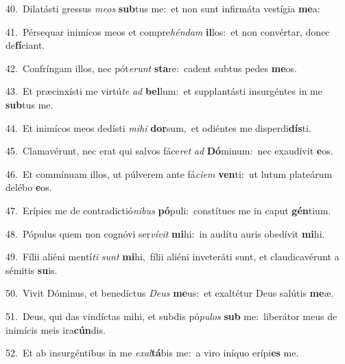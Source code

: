 {\numbfont\textcolor{\numbcolor}{40.}}~Dilatásti gressus \textit{me}\-\textit{os} \textbf{sub}\-tus me:~\star et non sunt infirmáta vestígia \textbf{me}\-a:\par
{\numbfont\textcolor{\numbcolor}{41.}}~Pérsequar inimícos meos et compre\-\textit{hén}\-\textit{dam} \textbf{il}\-los:~\star et non convértar, donec de\-\textbf{fí}\-ciant.\par
{\numbfont\textcolor{\numbcolor}{42.}}~Confríngam illos, nec pót\-\textit{e}\-\textit{runt} \textbf{sta}\-re:~\star cadent subtus pedes \textbf{me}\-os.\par
{\numbfont\textcolor{\numbcolor}{43.}}~Et præcinxísti me virtú\textit{te} \textit{ad} \textbf{bel}\-lum:~\star et supplantásti insurgéntes in me \textbf{sub}\-tus me.\par
{\numbfont\textcolor{\numbcolor}{44.}}~Et inimícos meos dedísti \textit{mi}\-\textit{hi} \textbf{dor}\-sum,~\star et odiéntes me disperdi\-\textbf{dís}\-ti.\par
{\numbfont\textcolor{\numbcolor}{45.}}~Clamavérunt, nec erat qui salvos fáce\textit{ret} \textit{ad} \textbf{Dó}\-minum:~\star nec exaudívit \textbf{e}\-os.\par
{\numbfont\textcolor{\numbcolor}{46.}}~Et commínuam illos, ut púlverem ante fá\-\textit{ci}\-\textit{em} \textbf{ven}\-ti:~\star ut lutum plateárum delébo \textbf{e}\-os.\par
{\numbfont\textcolor{\numbcolor}{47.}}~Erípies me de contradictió\-\textit{ni}\-\textit{bus} \textbf{pó}\-puli:~\star constítues me in caput \textbf{gén}\-tium.\par
{\numbfont\textcolor{\numbcolor}{48.}}~Pópulus quem non cognóvi ser\-\textit{ví}\-\textit{vit} \textbf{mi}\-hi:~\star in audítu auris obedívit \textbf{mi}\-hi.\par
{\numbfont\textcolor{\numbcolor}{49.}}~Fílii aliéni mentí\textit{ti} \textit{sunt} \textbf{mi}\-hi,~\star fílii aliéni inveteráti sunt, et claudicavérunt a sémitis \textbf{su}\-is.\par
{\numbfont\textcolor{\numbcolor}{50.}}~Vivit Dóminus, et benedíctus \textit{De}\-\textit{us} \textbf{me}\-us:~\star et exaltétur Deus salútis \textbf{me}\-æ.\par
{\numbfont\textcolor{\numbcolor}{51.}}~Deus, qui das vindíctas mihi, et subdis pó\-\textit{pu}\-\textit{los} \textbf{sub} me:~\star liberátor meus de inimícis meis ira\-\textbf{cún}\-dis.\par
{\numbfont\textcolor{\numbcolor}{52.}}~Et ab insurgéntibus in me \textit{ex}\-\textit{al}\textbf{tá}bis me:~\star a viro iníquo erípi\textbf{es} me.\par
